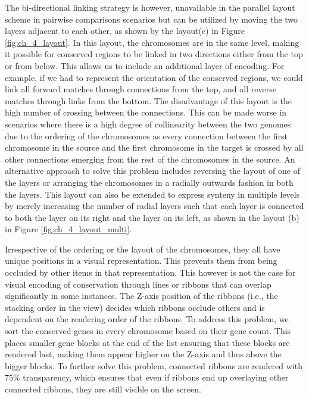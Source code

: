 The bi-directional linking strategy is however, unavailable in the parallel layout scheme in pairwise comparisons scenarios but can be utilized by moving the two layers adjacent to each other, as shown by the layout(c) in Figure \ref{fig:ch_4_layout}. In this layout,  the chromosomes are in the same level, making it possible for conserved regions to be linked in two directions either from the top or from below. This allows us to include an additional layer of encoding. For example, if we had to represent the orientation of the conserved regions, we could link all forward matches through connections from the top, and all reverse matches through links from the bottom. The disadvantage of this layout is the high number of crossing between the connections. This can be made worse in scenarios where there is a high degree of collinearity between the two genomes due to the ordering of the chromosomes as every connection between the first chromosome in the source and the first chromosome in the target is crossed by all other connections emerging from the rest of the chromosomes in the source. An alternative approach to solve this problem includes reversing the layout of one of the layers or arranging the chromosomes in a radially outwards fashion in both the layers. This layout can also be extended to express synteny in multiple levels by merely increasing the number of radial layers such that each layer is connected to both the layer on its right and the layer on its left, as shown in the layout (b) in Figure \ref{fig:ch_4_layout_multi}.



Irrespective of the ordering or the layout of the chromosomes, they all have unique positions in a visual representation. This prevents them from being occluded by other items in that representation. This however is not the case for  visual encoding of conservation through lines or ribbons that can overlap significantly in some instances. The Z-axis position of the ribbons (i.e., the stacking order in the view) decides which ribbons occlude others and is dependent on the rendering order of the ribbons. To address this problem, we sort the conserved genes in every chromosome based on their gene count. This places smaller gene blocks at the end of the list ensuring that these blocks are rendered last, making them appear higher on the Z-axis and thus above the bigger blocks. To further solve this problem, connected ribbons are rendered with 75\% transparency, which ensures that even if ribbons end up overlaying other connected ribbons, they are still visible on the screen.

